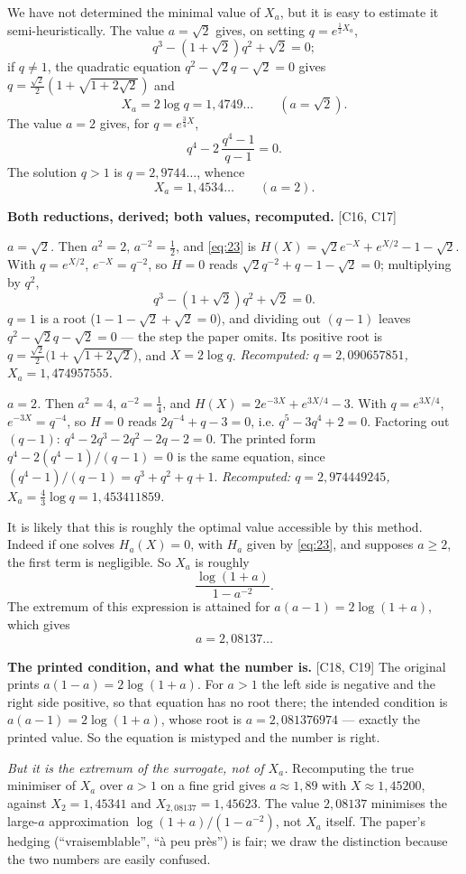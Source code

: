 \documentclass[11pt,reqno]{amsart}
\theoremstyle{plain}
\theoremstyle{definition}
\theoremstyle{remark}
\newcommand{\Ledger}[1]{{\scriptsize\textsf{[#1]}}}
\begin{document}
We have not determined the minimal value of $X_a$, but it is easy to estimate it
semi-heuristically. The value $a=\sqrt2$ gives, on setting $q=e^{\frac12X_a}$,
\[q^3-(1+\sqrt2)q^2+\sqrt2=0;\]
if $q\ne1$, the quadratic equation $q^2-\sqrt2q-\sqrt2=0$ gives
$q=\tfrac{\sqrt2}2(1+\sqrt{1+2\sqrt2})$ and
\[X_a=2\log q=1{,}4749\ldots\qquad(a=\sqrt2).\]
The value $a=2$ gives, for $q=e^{\frac34X}$,
\[q^4-2\,\frac{q^4-1}{q-1}=0 .\]
The solution $q>1$ is $q=2{,}9744\ldots$, whence
\[X_a=1{,}4534\ldots\qquad(a=2).\]

\begin{expansion}
\textbf{Both reductions, derived; both values, recomputed.} \Ledger{C16, C17}

\emph{$a=\sqrt2$.} Then $a^2=2$, $a^{-2}=\tfrac12$, and \eqref{eq:23} is
$H(X)=\sqrt2e^{-X}+e^{X/2}-1-\sqrt2$. With $q=e^{X/2}$, $e^{-X}=q^{-2}$, so
$H=0$ reads $\sqrt2q^{-2}+q-1-\sqrt2=0$; multiplying by $q^2$,
\[q^3-(1+\sqrt2)q^2+\sqrt2=0 .\]
$q=1$ is a root ($1-1-\sqrt2+\sqrt2=0$), and dividing out $(q-1)$ leaves
$q^2-\sqrt2q-\sqrt2=0$ --- the step the paper omits. Its positive root is
$q=\tfrac{\sqrt2}{2}\bigl(1+\sqrt{1+2\sqrt2}\bigr)$, and $X=2\log q$.
\emph{Recomputed: $q=2{,}090657851$, $X_a=1{,}474957555$.}

\emph{$a=2$.} Then $a^2=4$, $a^{-2}=\tfrac14$, and $H(X)=2e^{-3X}+e^{3X/4}-3$. With
$q=e^{3X/4}$, $e^{-3X}=q^{-4}$, so $H=0$ reads $2q^{-4}+q-3=0$, i.e.
$q^5-3q^4+2=0$. Factoring out $(q-1)$: $q^4-2q^3-2q^2-2q-2=0$. The printed form
$q^4-2(q^4-1)/(q-1)=0$ is the same equation, since
$(q^4-1)/(q-1)=q^3+q^2+q+1$. \emph{Recomputed: $q=2{,}974449245$,
$X_a=\tfrac43\log q=1{,}453411859$.}
\end{expansion}

It is likely that this is roughly the optimal value accessible by this method.
Indeed if one solves $H_a(X)=0$, with $H_a$ given by \eqref{eq:23}, and supposes
$a\ge2$, the first term is negligible. So $X_a$ is roughly
\[\frac{\log(1+a)}{1-a^{-2}} .\]
The extremum of this expression is attained for $a(a-1)=2\log(1+a)$, which gives
\[a=2{,}08137\ldots\]

\begin{expansion}
\textbf{The printed condition, and what the number is.} \Ledger{C18, C19}
The original prints $a(1-a)=2\log(1+a)$. For $a>1$ the left side is negative and the
right side positive, so that equation has no root there; the intended condition is
$a(a-1)=2\log(1+a)$, whose root is $a=2{,}081376974$ --- exactly the printed value.
So the equation is mistyped and the number is right.

\emph{But it is the extremum of the surrogate, not of $X_a$.} Recomputing the true
minimiser of $X_a$ over $a>1$ on a fine grid gives $a\approx1{,}89$ with
$X\approx1{,}45200$, against $X_{2}=1{,}45341$ and $X_{2{,}08137}=1{,}45623$. The
value $2{,}08137$ minimises the large-$a$ approximation
$\log(1+a)/(1-a^{-2})$, not $X_a$ itself. The paper's hedging (``vraisemblable'',
``\`a peu pr\`es'') is fair; we draw the distinction because the two numbers are
easily confused.
\end{expansion}
\end{document}
